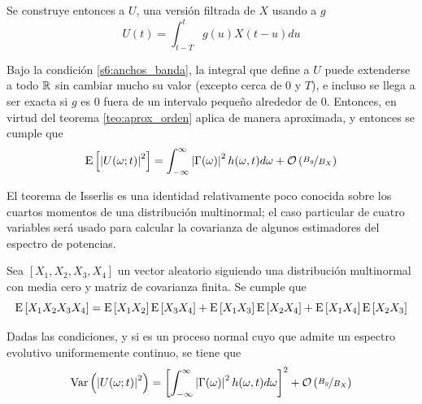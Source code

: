 Se construye entonces a $U$, una versión filtrada de $X$ usando a $g$
\begin{equation}
U(t) = \int_{t-T}^{t} g(u) X(t-u) du
\end{equation}

Bajo la condición \ref{s6:anchos_banda}, la integral que define a $U$ puede extenderse a todo $\mathbb{R}$ sin cambiar mucho su valor (excepto cerca de 0 y $T$), e incluso se llega a ser exacta si $g$ es 0 fuera de un intervalo pequeño alrededor de 0. Entonces, en virtud del teorema \ref{teo:aprox_orden}
aplica de manera aproximada, y entonces se cumple que
\begin{equation}
\mathrm{E}\left[ \left| U(\omega; t) \right|^{2} \right] = \int_{-\infty}^{\infty} \left| \Gamma(\omega) \right|^{2} h(\omega, t)d\omega + \mathcal{O}\left( \nicefrac{B_g}{B_X} \right)
\end{equation}


El teorema de Isserlis es una identidad relativamente poco conocida sobre los cuartos momentos de una distribución multinormal; el caso particular de cuatro variables será usado para calcular la covarianza de algunos estimadores del espectro de potencias.

\begin{teorema}[Isserlis]
Sea $[X_1, X_2, X_3, X_4]$ un vector aleatorio siguiendo una distribución multinormal con media cero y matriz de covarianza finita. Se cumple que
\begin{equation}
\mathrm{E}\left[ X_1 X_2 X_3 X_4 \right] = \mathrm{E}\left[ X_1 X_2 \right] \mathrm{E}\left[ X_3 X_4 \right] + \mathrm{E}\left[ X_1 X_3 \right] \mathrm{E}\left[ X_2 X_4 \right] + \mathrm{E}\left[ X_1 X_4 \right] \mathrm{E}\left[ X_2 X_3 \right]
\end{equation}
\label{teo:isserlis}
\end{teorema}

%

\begin{proposicion}
Dadas las condiciones, y si \xt es un proceso normal cuyo que admite un espectro evolutivo uniformemente continuo, se tiene que
\begin{equation}
\mathrm{Var}\left( \left| U(\omega;t) \right|^{2} \right) = \left[ \int_{-\infty}^{\infty} \left| \Gamma(\omega) \right|^{2} h(\omega, t)d\omega \right]^{2} + \mathcal{O}\left( \nicefrac{B_g}{B_X} \right)
\end{equation}
\end{proposicion}


